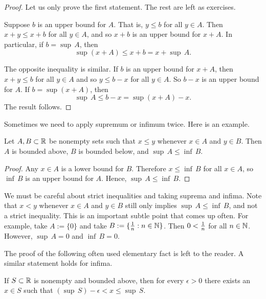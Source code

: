 \begin{proof}
Let us only prove the first statement.  The rest are left as exercises.

Suppose $b$ is an upper bound for $A$.  That is, $y \leq b$ for all $y \in A$.
Then $x+y \leq x+b$ for all $y \in A$, and so $x+b$ is an upper
bound for $x+A$.  In particular, if $b = \sup\, A$, then
\begin{equation*}
\sup (x+A) \leq x+b = x+ \sup\, A .
\end{equation*}

The opposite inequality is similar.  If $b$ is an upper bound for $x+A$,
then $x+y \leq b$
for all $y \in A$ and so $y \leq b-x$ for all $y \in A$.
So $b-x$ is an upper bound for $A$.  If $b =
\sup (x+A)$, then 
\begin{equation*}
\sup\, A \leq b-x = \sup (x+A) -x .
\end{equation*}
The result follows.
\end{proof}

Sometimes we need to apply supremum or infimum twice.  Here is an example.

\begin{prop} \label{infsupineq:prop}
Let $A, B \subset \R$ be nonempty sets such that $x \leq y$ whenever $x \in A$ and
$y \in B$.  Then $A$ is bounded above, $B$ is bounded below, and $\sup\, A \leq \inf\, B$.
\end{prop}

\begin{proof}
Any $x \in A$ is a lower bound for $B$.  Therefore
$x \leq \inf\, B$ for all $x \in A$, so $\inf\, B$ is an upper bound for
$A$.
Hence,
$\sup\, A \leq \inf\, B$.
\end{proof}

We must be careful about strict inequalities and taking suprema and
infima.  Note that
$x < y$ whenever $x \in A$ and
$y \in B$ still only implies $\sup\, A \leq \inf\, B$, and not a strict
inequality.  This is an important subtle point that comes up often.
For example, take $A := \{ 0 \}$ and take $B := \{ \nicefrac{1}{n}
: n \in \N \}$.
Then $0 < \nicefrac{1}{n}$
for all $n \in \N$.  However, $\sup\, A = 0$ and $\inf\, B = 0$.


The proof of the following
often used elementary fact is left to the reader.
A similar statement holds for infima.

\begin{prop} \label{prop:existsxepsfromsup}
If $S \subset \R$ is nonempty and bounded above,
then for every $\epsilon > 0$ there exists an $x \in S$ such
that $(\sup\, S) - \epsilon < x \leq \sup\, S$.
\end{prop}


